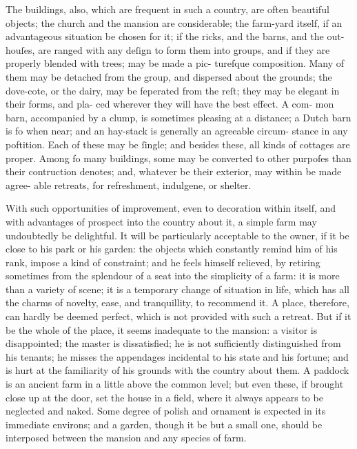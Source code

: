 \documentclass{article}
\begin{document}
The buildings, also, which are frequent in such a
country, are often beautiful objects; the church and
the mansion are considerable; the farm-yard itself, if
an advantageous situation be chosen for it; if the
ricks, and the barns, and the out-houſes, are ranged
with any deſign to form them into groups, and if they
are properly blended with trees; may be made a pic-
turefque composition. Many of them may be detached
from the group, and dispersed about the grounds;
the dove-cote, or the dairy, may be feperated from
the reſt; they may be elegant in their forms, and pla-
ced wherever they will have the best effect. A com-
mon barn, accompanied by a clump, is sometimes
pleasing at a distance; a Dutch barn is fo when near;
and an hay-stack is generally an agreeable circum-
stance in any poftition. Each of these may be ſingle;
and besides these, all kinds of cottages are proper.
Among fo many buildings, some may be converted to
other purpofes than their contruction denotes; and,
whatever be their exterior, may within be made agree-
able retreats, for refreshment, indulgene, or shelter.

With such opportunities of improvement, even to decoration within itself, and with advantages of prospect into the country about it, a simple farm may undoubtedly be delightful. It will be particularly acceptable to the owner, if it be close to his park or his garden: the objects which constantly remind him of his rank, impose a kind of constraint; and he feels himself relieved, by retiring sometimes from the splendour of a seat into the simplicity of a farm: it is more than a variety of scene; it is a temporary change of situation in life, which has all the charms of novelty, ease, and tranquillity, to recommend it. A place, therefore, can hardly be deemed perfect, which is not provided with such a retreat. But if it be the whole of the place, it seems inadequate to the mansion: a visitor is disappointed; the master is dissatisfied; he is not sufficiently distinguished from his tenants; he misses the appendages incidental to his state and his fortune; and is hurt at the familiarity of his grounds with the country about them. A paddock is an ancient farm in a little above the common level; but even these, if brought close up at the door, set the house in a field, where it always appears to be neglected and naked. Some degree of polish and ornament is expected in its immediate environs; and a garden, though it be but a small one, should be interposed between the mansion and any species of farm.
\end{document}
